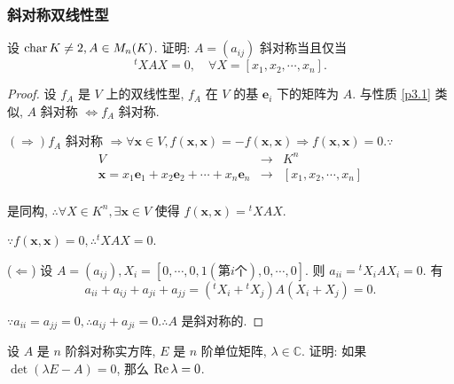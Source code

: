 \documentclass[color=black,device=normal,lang=cn,mode=geye]{elegantnote}
\begin{document}
\subsubsection{斜对称双线性型}
\begin{exercisec}[1.7.11]\label{exc1.7.11}
    设 $\operatorname{char} K\neq 2,A\in M_n(K)$. 证明: $A=(a_{ij})$ 斜对称当且仅当
    \[{}^tXAX=0,\quad\forall X=[x_1,x_2,\cdots,x_n].\]
\end{exercisec}
\begin{proof}
    设 $f_A$ 是 $V$ 上的双线性型, $f_A$ 在 $V$ 的基 $\boldsymbol{e}_i$ 下的矩阵为 $A$. 与性质 \ref{p3.1} 类似, $A$ 斜对称 $\Leftrightarrow f_A$ 斜对称.

    $(\Rightarrow)f_A$ 斜对称 $\Rightarrow\forall\boldsymbol{x}\in V,f(\boldsymbol{x},\boldsymbol{x})=-f(\boldsymbol{x},\boldsymbol{x})\Rightarrow f(\boldsymbol{x},\boldsymbol{x})=0.\because$
    \[\begin{array}{rcl}
        V & \to & K^n \\
        \boldsymbol{x}=x_1\boldsymbol{e}_1+x_2\boldsymbol{e}_2+\cdots+x_n\boldsymbol{e}_n & \to & [x_1,x_2,\cdots,x_n] \\
    \end{array}\]

    是同构, $\therefore\forall X\in K^n,\exists\boldsymbol{x}\in V$ 使得 $f(\boldsymbol{x},\boldsymbol{x})={}^tXAX$.

    $\because f(\boldsymbol{x},\boldsymbol{x})=0,\therefore{}^tXAX=0$.

    ($\Leftarrow$) 设 $A=(a_{ij}),X_i=[0,\cdots,0,1(\text{第}i\text{个}),0,\cdots,0]$. 则 $a_{ii}={}^tX_iAX_i=0$. 有
    \[a_{ii}+a_{ij}+a_{ji}+a_{jj}=({}^tX_i+{}^tX_j)A(X_i+X_j)=0.\]

    $\because a_{ii}=a_{jj}=0,\therefore a_{ij}+a_{ji}=0.\therefore A$ 是斜对称的.
\end{proof}
\begin{exercisec}[1.7.13]
    设 $A$ 是 $n$ 阶斜对称实方阵, $E$ 是 $n$ 阶单位矩阵, $\lambda\in\mathbb{C}$. 证明: 如果 $\det(\lambda E-A)=0$, 那么 $\operatorname{Re}\lambda=0$.
\end{exercisec}
\end{document}
